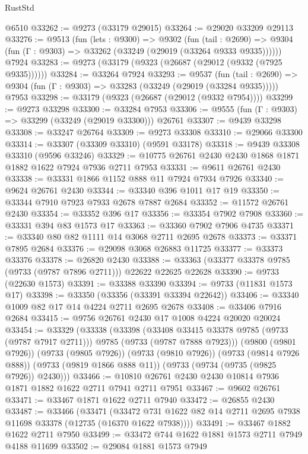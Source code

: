 \begin{lexlean}{RustStd}
\begin{coremodule}
{\begin{coremodule}
{{{{{{{{{{{{{{{{{{{{{{{{{{{{{{{{{{{{{{{{{{{{{{{{{{{{{{{    @6510
@33262 := @9273 (@33179 @29015)
@33264 := @29020 @33209 @29113
@33276 := @9513
    (fun (lets : @9300) =>
    @9302
      (fun (tail : @2690) =>
      @9304 (fun (Γ : @9303) => @33262 (@33249 (@29019 (@33264 @9333 @9335))))))
    @7924
@33283 := @9273 (@33179 (@9323 (@26687 (@29012 (@9332 (@7925 @9335))))))
@33284 := @33264 @7924
@33293 := @9537
    (fun (tail : @2690) => @9304 (fun (Γ : @9303) => @33283 (@33249 (@29019 (@33284 @9335)))))
    @7953
@33298 := @33179 (@9323 (@26687 (@29012 (@9332 @7954))))
@33299 := @9273 @33298
@33300 := @33284 @7953
@33306 := @9555 (fun (Γ : @9303) => @33299 (@33249 (@29019 @33300))) @26761
@33307 := @9439 @33298
@33308 := @33247 @26764
@33309 := @9273 @33308
@33310 := @29066 @33300
@33314 := @33307 (@33309 @33310) (@9591 @33178)
@33318 := @9439 @33308 @33310 (@9596 @33246)
@33329 := @10775 @26761 @2430 @2430 @1868 @1871 @1882 @1622 @7924 @7936 @2711 @7953
@33331 := @9611 @26761 @2430
@33338 := @33331 @1866 @1152 @888 @11 @7924 @7934 @7926
@33340 := @9624 @26761 @2430
@33344 := @33340 @396 @1011 @17 @19
@33350 := @33344 @7910 @7923 @7933 @2678 @7887 @2684
@33352 := @11572 @26761 @2430
@33354 := @33352 @396 @17
@33356 := @33354 @7902 @7908
@33360 := @33331 @394 @83 @1573 @17
@33363 := @33360 @7902 @7906 @4735
@33371 := @33340 @80 @82 @1111 @14 @3068 @2711 @2695 @2678
@33373 := @33371 @7895 @2684
@33376 := @29098 @3068 @26883 @11725
@33377 := @33373 @33376
@33378 := @26820 @2430
@33388 := @33363 (@33377 @33378 @9785 (@9733 (@9787 @7896 @2711))) @22622 @22625 @22628
@33390 := @9733 (@22630 @1573)
@33391 := @33388 @33390
@33394 := @9733 (@11831 @1573 @17)
@33398 := @33350 (@33356 (@33391 @33394 @22642))
@33406 := @33340 @1009 @82 @17 @14 @4224 @2711 @2695 @2678
@33408 := @33406 @7916 @2684
@33415 := @9756 @26761 @2430 @17 @1008 @4224 @20020 @20024
@33454 := @33329
    (@33338
      (@33398
        (@33408 @33415 @33378 @9785 (@9733 (@9787 @7917 @2711)))
        @9785
        (@9733 (@9787 @7888 @7923)))
      (@9800 (@9801 @7926))
      (@9733 (@9805 @7926))
      (@9733 (@9810 @7926))
      (@9733 (@9814 @7926 @888))
      (@9733 (@9819 @1866 @888 @11))
      (@9733 (@9734 (@9735 (@9825 @7926)) @2430)))
@33466 := @10810 @26761 @2430 @2430 @10814 @7936 @1871 @1882 @1622 @2711 @7941 @2711 @7951
@33467 := @9602 @26761
@33471 := @33467 @1871 @1622 @2711 @7940
@33472 := @26855 @2430
@33487 := @33466
    (@33471
      (@33472 @731 @1622 @82 @14 @2711 @2695 @7938 @11698 @33378 (@12735 (@16370 @1622 @7938))))
@33491 := @33467 @1882 @1622 @2711 @7950
@33499 := @33472 @744 @1622 @1881 @1573 @2711 @7949 @4188 @11699
@33502 := @29084 @1881 @1573 @7949
}}}}}}}}}}}}}}}}}}}}}}}}}}}}}}}}}}}}}}}}}}}}}}}}}}}}}}}
\end{coremodule}}
\end{coremodule}
\end{lexlean}
